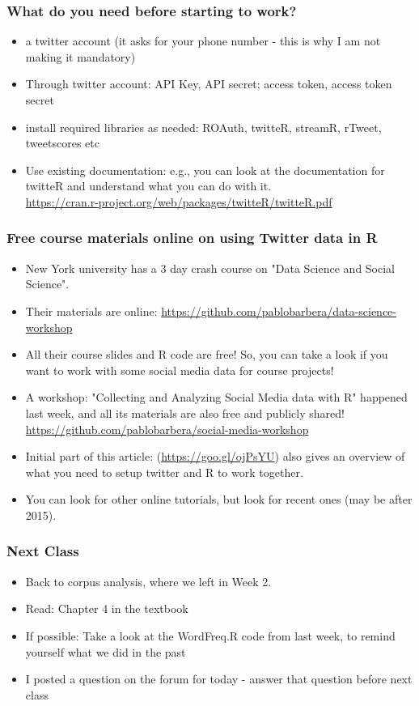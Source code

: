 \documentclass{beamer}
\begin{document}
\begin{frame}
\frametitle{What do you need before starting to work?}
\begin{itemize}
\item a twitter account (it asks for your phone number - this is why I am not making it mandatory)
\item Through twitter account: API Key, API secret; access token, access token secret
\item install required libraries as needed: ROAuth, twitteR, streamR, rTweet, tweetscores etc
\item Use existing documentation: e.g., you can look at the documentation for twitteR and understand what you can do with it. 
\\ \url{https://cran.r-project.org/web/packages/twitteR/twitteR.pdf}
\end{itemize}
\end{frame}

\begin{frame}
\frametitle{Free course materials online on using Twitter data in R}
\begin{itemize}
\item New York university has a 3 day crash course on "Data Science and Social Science".
\item Their materials are online: \url{https://github.com/pablobarbera/data-science-workshop}
\item All their course slides and R code are free! So, you can take a look if you want to work with some social media data for course projects! \pause
\item A workshop: "Collecting and Analyzing Social Media data with R" happened last week, and all its materials are also free and publicly shared! \\ \url{https://github.com/pablobarbera/social-media-workshop}
\pause
\item Initial part of this article: (\url{https://goo.gl/ojPsYU}) also gives an overview of what you need to setup twitter and R to work together.
\item You can look for other online tutorials, but look for recent ones (may be after 2015).
\end{itemize}
\end{frame}

\begin{frame}
\frametitle{Next Class}
\begin{itemize}
\item Back to corpus analysis, where we left in Week 2.
\item Read: Chapter 4 in the textbook
\item If possible: Take a look at the WordFreq.R code from last week, to remind yourself what we did in the past
\item I posted a question on the forum for today - answer that question before next class
\end{itemize}
\end{frame}
\end{document}
